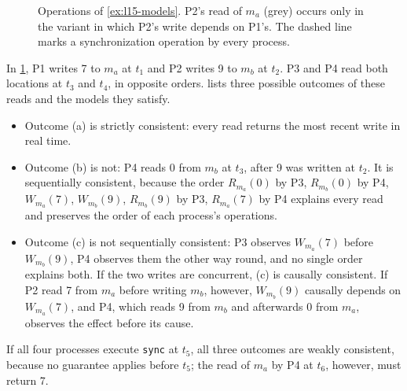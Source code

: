 \documentclass[../main.tex]{subfiles}
\begin{document}
\begin{figure}[htbp]
  \centering
  
  \caption{Operations of \cref{ex:l15-models}.  P2's read of $m_a$ (grey)
    occurs only in the variant in which P2's write depends on P1's.  The
    dashed line marks a synchronization operation by every process.}
  \label{fig:l15-models}
\end{figure}

\begin{example}
  \label{ex:l15-models}
  In \cref{fig:l15-models}, P1 writes 7 to $m_a$ at $t_1$ and P2 writes 9 to
  $m_b$ at $t_2$.  P3 and P4 read both locations at $t_3$ and $t_4$, in
  opposite orders.   lists three possible outcomes of
  these reads and the models they satisfy.
  \begin{itemize}
    \item Outcome (a) is strictly consistent: every read returns the most
      recent write in real time.
    \item Outcome (b) is not: P4 reads 0 from $m_b$ at $t_3$, after 9 was
      written at $t_2$.  It is sequentially consistent, because the order
      $R_{m_a}(0)$ by P3, $R_{m_b}(0)$ by P4, $W_{m_a}(7)$, $W_{m_b}(9)$,
      $R_{m_b}(9)$ by P3, $R_{m_a}(7)$ by P4 explains every read and
      preserves the order of each process's operations.
    \item Outcome (c) is not sequentially consistent: P3 observes
      $W_{m_a}(7)$ before $W_{m_b}(9)$, P4 observes them the other way
      round, and no single order explains both.  If the two writes are
      concurrent, (c) is causally consistent.  If P2 read 7 from $m_a$
      before writing $m_b$, however, $W_{m_b}(9)$ causally depends on
      $W_{m_a}(7)$, and P4, which reads 9 from $m_b$ and afterwards 0 from
      $m_a$, observes the effect before its cause.
  \end{itemize}
  If all four processes execute \texttt{sync} at $t_5$, all three outcomes
  are weakly consistent, because no guarantee applies before $t_5$; the read
  of $m_a$ by P4 at $t_6$, however, must return 7.
\end{example}
\end{document}
